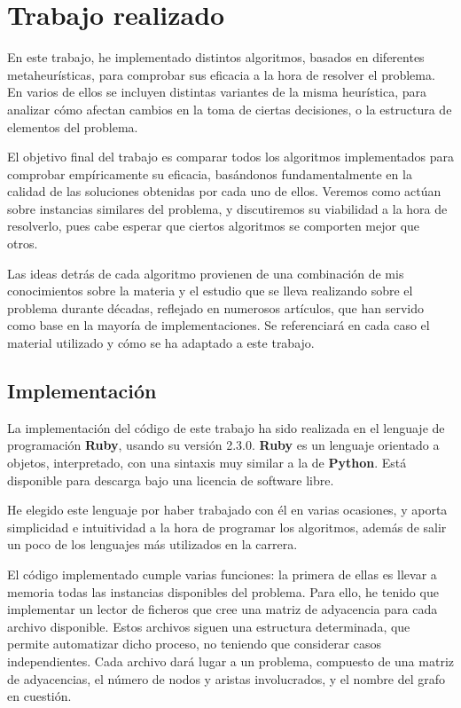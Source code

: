 \section{Trabajo realizado}

En este trabajo, he implementado distintos algoritmos, basados en diferentes
metaheurísticas, para comprobar sus eficacia a la hora de resolver el problema.
En varios de ellos se incluyen distintas variantes de la misma heurística, para
analizar cómo afectan cambios en la toma de ciertas decisiones, o la estructura
de elementos del problema.

El objetivo final del trabajo es comparar todos los algoritmos implementados
para comprobar empíricamente su eficacia, basándonos fundamentalmente en la
calidad de las soluciones obtenidas por cada uno de ellos. Veremos como actúan
sobre instancias similares del problema, y discutiremos su viabilidad a la
hora de resolverlo, pues cabe esperar que ciertos algoritmos se comporten
mejor que otros.

Las ideas detrás de cada algoritmo provienen de una combinación de mis conocimientos
sobre la materia y el estudio que se lleva realizando sobre el problema durante décadas,
reflejado en numerosos artículos, que han servido como base en la mayoría de implementaciones.
Se referenciará en cada caso el material utilizado y cómo se ha adaptado a este trabajo.

\subsection{Implementación}

La implementación del código de este trabajo ha sido realizada en el lenguaje de
programación \textbf{Ruby}, usando su versión 2.3.0. \textbf{Ruby} es un lenguaje
orientado a objetos, interpretado, con una sintaxis muy similar a la de \textbf{Python}.
Está disponible para descarga bajo una licencia de software libre.

He elegido este lenguaje por haber trabajado con él en varias ocasiones, y aporta
simplicidad e intuitividad a la hora de programar los algoritmos, además de salir
un poco de los lenguajes más utilizados en la carrera.

El código implementado cumple varias funciones: la primera de ellas es llevar a
memoria todas las instancias disponibles del problema. Para ello, he tenido que
implementar un lector de ficheros que cree una matriz de adyacencia para cada archivo
disponible. Estos archivos siguen una estructura determinada, que permite
automatizar dicho proceso, no teniendo que considerar casos independientes.
Cada archivo dará lugar a un problema, compuesto de una matriz de adyacencias,
el número de nodos y aristas involucrados, y el nombre del grafo en cuestión.

